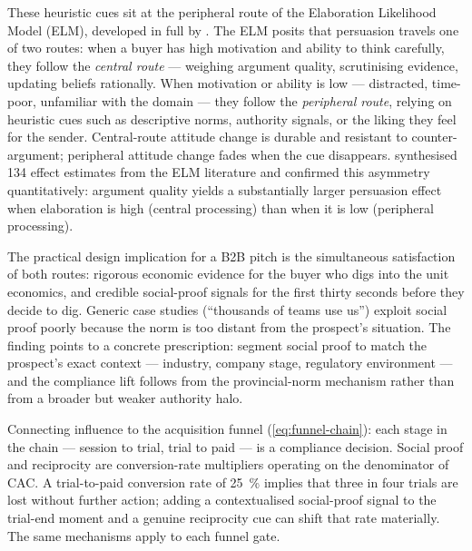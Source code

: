 These heuristic cues sit at the peripheral route of the Elaboration Likelihood Model
(ELM), developed in full by \textcite{petty1986elaboration}. The ELM posits that persuasion
travels one of two routes: when a buyer has high motivation and ability to think carefully,
they follow the \emph{central route} --- weighing argument quality, scrutinising evidence,
updating beliefs rationally. When motivation or ability is low --- distracted, time-poor,
unfamiliar with the domain --- they follow the \emph{peripheral route}, relying on heuristic
cues such as descriptive norms, authority signals, or the liking they feel for the sender.
Central-route attitude change is durable and resistant to counter-argument; peripheral
attitude change fades when the cue disappears. \textcite{carpenter2015meta} synthesised 134
effect estimates from the ELM literature and confirmed this asymmetry quantitatively:
argument quality yields a substantially larger persuasion effect when elaboration is high
(central processing) than when it is low (peripheral processing).

The practical design implication for a B2B pitch is the simultaneous satisfaction of both
routes: rigorous economic evidence for the buyer who digs into the unit economics, and
credible social-proof signals for the first thirty seconds before they decide to dig.
Generic case studies (``thousands of teams use us'') exploit social proof poorly because
the norm is too distant from the prospect's situation. The \textcite{goldstein2008field}
finding points to a concrete prescription: segment social proof to match the prospect's
exact context --- industry, company stage, regulatory environment --- and the compliance
lift follows from the provincial-norm mechanism rather than from a broader but weaker
authority halo.

Connecting influence to the acquisition funnel (\cref{eq:funnel-chain}): each stage in
the chain --- session to trial, trial to paid --- is a compliance decision. Social proof
and reciprocity are conversion-rate multipliers operating on the denominator of CAC. A
trial-to-paid conversion rate of \qty{25}{\percent} implies that three in four trials are
lost without further action; adding a contextualised social-proof signal to the trial-end
moment and a genuine reciprocity cue can shift that rate materially. The same mechanisms
apply to each funnel gate.

